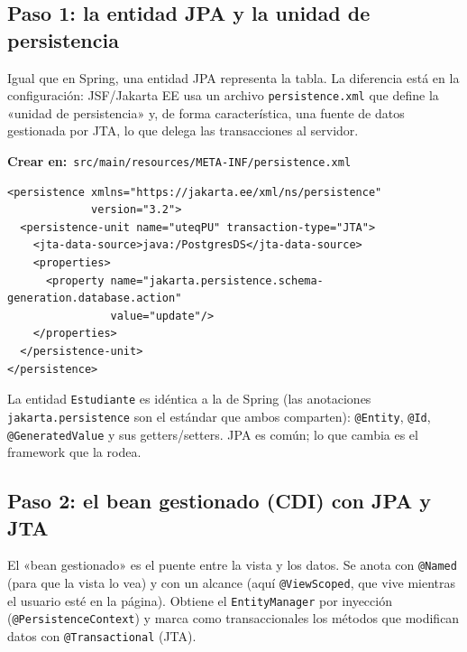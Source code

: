 \documentclass[11pt]{article}
\begin{document}
\subsection{Paso 1: la entidad JPA y la unidad de persistencia}
Igual que en Spring, una entidad JPA representa la tabla. La diferencia está en la configuración: JSF/Jakarta EE usa un archivo \texttt{persistence.\allowbreak{}xml} que define la «unidad de persistencia» y, de forma característica, una fuente de datos gestionada por JTA, lo que delega las transacciones al servidor.

{\small\color{jwebazulo}\textbf{Crear en:}~}\texttt{src/\allowbreak{}main/\allowbreak{}resources/\allowbreak{}META-INF/\allowbreak{}persistence.\allowbreak{}xml}\par\nobreak\vspace{-1pt}
\begin{cajacodigo}
\begin{lstlisting}[style=xml]
<persistence xmlns="https://jakarta.ee/xml/ns/persistence"
             version="3.2">
  <persistence-unit name="uteqPU" transaction-type="JTA">
    <jta-data-source>java:/PostgresDS</jta-data-source>
    <properties>
      <property name="jakarta.persistence.schema-generation.database.action"
                value="update"/>
    </properties>
  </persistence-unit>
</persistence>
\end{lstlisting}
\end{cajacodigo}
\vspace{2pt}
La entidad \texttt{Estudiante} es idéntica a la de Spring (las anotaciones \texttt{jakarta.\allowbreak{}persistence} son el estándar que ambos comparten): \texttt{@Entity}, \texttt{@Id}, \texttt{@Generated\allowbreak{}Value} y sus getters/setters. JPA es común; lo que cambia es el framework que la rodea.

\subsection{Paso 2: el bean gestionado (CDI) con JPA y JTA}
El «bean gestionado» es el puente entre la vista y los datos. Se anota con \texttt{@Named} (para que la vista lo vea) y con un alcance (aquí \texttt{@View\allowbreak{}Scoped}, que vive mientras el usuario esté en la página). Obtiene el \texttt{Entity\allowbreak{}Manager} por inyección (\texttt{@Persistence\allowbreak{}Context}) y marca como transaccionales los métodos que modifican datos con \texttt{@Transactional} (JTA).
\end{document}
